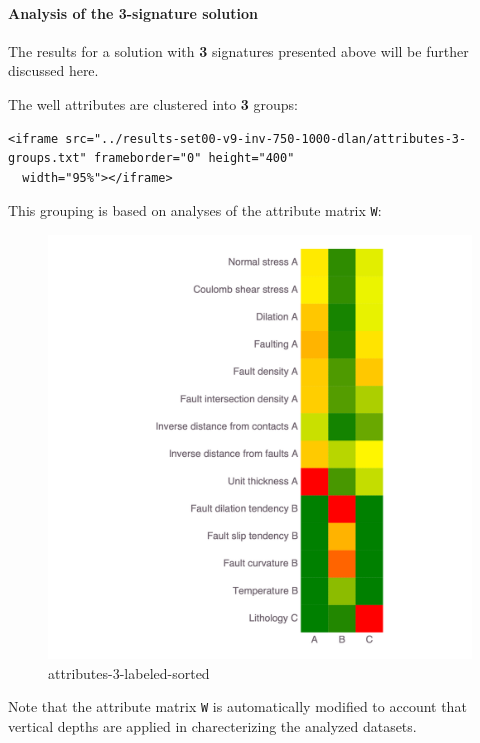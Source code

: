\documentclass[11pt]{article}
\begin{document}
    \hypertarget{analysis-of-the-3-signature-solution}{%
\paragraph{Analysis of the 3-signature
solution}\label{analysis-of-the-3-signature-solution}}

The results for a solution with \textbf{3} signatures presented above
will be further discussed here.

The well attributes are clustered into \textbf{3} groups:

\begin{verbatim}
<iframe src="../results-set00-v9-inv-750-1000-dlan/attributes-3-groups.txt" frameborder="0" height="400"
  width="95%"></iframe>
\end{verbatim}

This grouping is based on analyses of the attribute matrix \texttt{W}:

\begin{figure}
\centering
\includegraphics{../figures-set00-v9-inv-750-1000-dlan/attributes-3-labeled-sorted.png}
\caption{attributes-3-labeled-sorted}
\end{figure}

Note that the attribute matrix \texttt{W} is automatically modified to
account that vertical depths are applied in charecterizing the analyzed
datasets.
\end{document}
